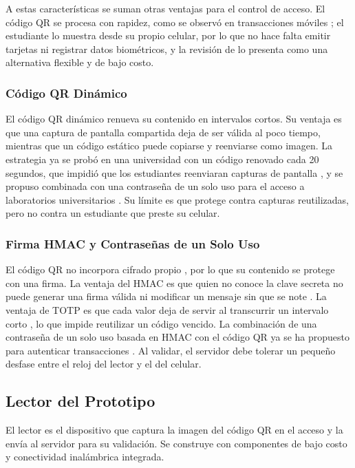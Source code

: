 A estas características se suman otras ventajas para el control de acceso.
El código QR se procesa con rapidez, como se observó en transacciones móviles
\parencite{harnaningrum2024comparison}; el estudiante lo muestra desde su
propio celular, por lo que no hace falta emitir tarjetas ni registrar datos
biométricos, y la revisión de \textcite{alsawi2026qracs} lo presenta como una
alternativa flexible y de bajo costo.

\subsubsection{Código QR Dinámico}
El código QR dinámico renueva su contenido en intervalos cortos. Su ventaja
es que una captura de pantalla compartida deja de ser válida al poco tiempo,
mientras que un código estático puede copiarse y reenviarse como imagen. La
estrategia ya se probó en una universidad con un código renovado cada 20
segundos, que impidió que los estudiantes reenviaran capturas de pantalla
\parencite{nwabuwe2023dynamicqr}, y se propuso combinada con una contraseña de
un solo uso para el acceso a laboratorios universitarios
\parencite{chaabani2023labqr}. Su límite es que protege contra capturas
reutilizadas, pero no contra un estudiante que preste su celular.

\subsubsection{Firma HMAC y Contraseñas de un Solo Uso}
El código QR no incorpora cifrado propio
\parencite{harnaningrum2024comparison}, por lo que su contenido se protege con
una firma. La ventaja del HMAC es que quien no conoce la clave secreta no
puede generar una firma válida ni modificar un mensaje sin que se note
\parencite{krawczyk1997hmac}. La ventaja de TOTP es que cada valor deja de
servir al transcurrir un intervalo corto \parencite{mraihi2011totp}, lo que
impide reutilizar un código vencido. La combinación de una contraseña de un
solo uso basada en HMAC con el código QR ya se ha propuesto para autenticar
transacciones \parencite{subpratatsavee2015hmac}. Al validar, el servidor debe
tolerar un pequeño desfase entre el reloj del lector y el del celular.

\subsection{Lector del Prototipo}
El lector es el dispositivo que captura la imagen del código QR en el acceso y
la envía al servidor para su validación. Se construye con componentes de bajo
costo y conectividad inalámbrica integrada.

